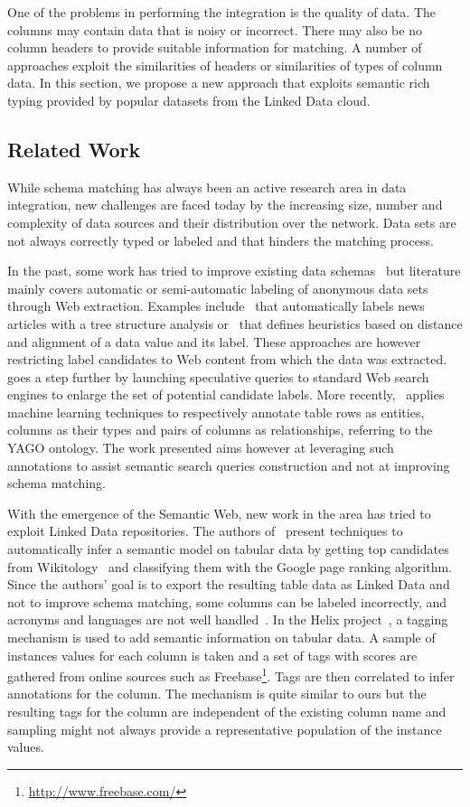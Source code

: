 One of the problems in performing the integration is the quality of data. The columns may contain data that is noisy or incorrect. There may also be no column headers to provide suitable information for matching. A number of approaches exploit the similarities of headers or similarities of types of column data. In this section, we propose a new approach that exploits semantic rich typing provided by popular datasets from the Linked Data cloud.

\subsection{Related Work}

While schema matching has always been an active research area in data integration, new challenges are faced today by the increasing size, number and complexity of data sources and their distribution over the network. Data sets are not always correctly typed or labeled and that hinders the matching process.

In the past, some work has tried to improve existing data schemas~\cite{ Miller:IEEE:03} but literature mainly covers automatic or semi-automatic labeling of anonymous data sets through Web extraction. Examples include~\cite{Reis:WWW:04} that automatically labels news articles with a tree structure analysis or~\cite{Wang:WWW:03} that defines heuristics based on distance and alignment of a data value and its label. These approaches are however restricting label candidates to Web content from which the data was extracted.~\cite{DaSilva:OTM:07} goes a step further by launching speculative queries to standard Web search engines to enlarge the set of potential candidate labels. More recently,~\cite{Limaye:VLDB:10} applies machine learning techniques to respectively annotate table rows as entities, columns as their types and pairs of columns as relationships, referring to the YAGO ontology. The work presented aims however at leveraging such annotations to assist semantic search queries construction and not at improving schema matching.

With the emergence of the Semantic Web, new work in the area has tried to exploit Linked Data repositories. The authors of~\cite{Syed:WebSci:10} present techniques to automatically infer a semantic model on tabular data by getting top candidates from Wikitology~\cite{Finin:AAAI:09} and classifying them with the Google page ranking algorithm. Since the authors' goal is to export the resulting table data as Linked Data and not to improve schema matching, some columns can be labeled incorrectly, and acronyms and languages are not well handled~\cite{Syed:WebSci:10}. In the Helix project~\cite{Hassanzadeh:WWW:11}, a tagging mechanism is used to add semantic information on tabular data. A sample of instances values for each column is taken and a set of tags with scores are gathered from online sources such as Freebase\footnote{\url{http://www.freebase.com/}}. Tags are then correlated to infer annotations for the column. The mechanism is quite similar to ours but the resulting tags for the column are independent of the existing column name and sampling might not always provide a representative population of the instance values.


